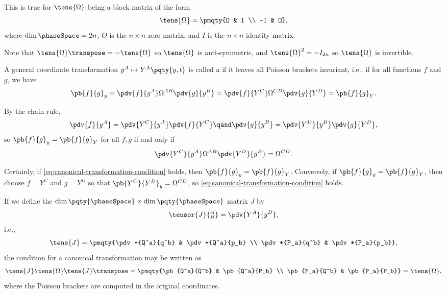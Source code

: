 This is true for \(\tens{\Omega}\) being a block matrix of the form
\begin{equation}
    \tens{\Omega} = \pmqty{O & I \\ -I & O},
\end{equation} 
where \(\dim \phaseSpace = 2n\), \(O\) is the \(n \times n\) zero matrix, and \(I\) is the \(n \times n\) identity matrix.

Note that \(\tens{\Omega} \transpose = - \tens{\Omega}\) so \(\tens{\Omega}\) is anti-symmetric, and \(\tens{\Omega}^2 = - I_{2n}\) so \(\tens{\Omega}\) is invertible.

A general coordinate transformation \(y^A \mapsto Y^A\pqty{y, t}\) is called a  if it leaves all Poisson brackets invariant, i.e., if for all functions \(f\) and \(g\), we have
\begin{equation}
    \pb{f}{g}_y = \pdv{f}{y^A} \Omega^{AB} \pdv{g}{y^B} = \pdv{f}{Y^C} \Omega^{CD} \pdv{g}{Y^D} = \pb{f}{g}_Y.
\end{equation}

By the chain rule,
\begin{equation}
    \pdv{f}{y^A} = \pdv{Y^C}{y^A} \pdv{f}{Y^C} \qand \pdv{g}{y^B} = \pdv{Y^D}{y^B} \pdv{g}{Y^D},
\end{equation}
so \(\pb{f}{g}_y = \pb{f}{g}_Y\) for all \(f, g\) if and only if
\begin{equation}
    \label{eq:canonical-transformation-condition}%
    \pdv{Y^C}{y^A} \Omega^{AB} \pdv{Y^D}{y^B} = \Omega^{CD}.
\end{equation}

Certainly, if \eqref{eq:canonical-transformation-condition} holds, then \(\pb{f}{g}_y = \pb{f}{g}_Y\). Conversely, if \(\pb{f}{g}_y = \pb{f}{g}_Y\), then choose \(f = Y^C\) and \(g = Y^D\) so that \(\pb{Y^C}{Y^D}_y = \Omega^{CD}\), so \eqref{eq:canonical-transformation-condition} holds.

If we define the \(\dim\pqty{\phaseSpace} \times \dim\pqty{\phaseSpace}\) matrix \(J\) by
\begin{equation}
    \tensor{J}{^A_B} = \pdv{Y^A}{y^B},
\end{equation}
i.e.,
\begin{equation}
    \tens{J} = \pmqty{\pdv*{Q^a}{q^b} & \pdv*{Q^a}{p_b} \\ \pdv*{P_a}{q^b} & \pdv*{P_a}{p_b}},
\end{equation}
the condition for a canonical transformation may be written as
\begin{equation}
    \tens{J} \tens{\Omega} \tens{J}\transpose = \pmqty{\pb{Q^a}{Q^b} & \pb{Q^a}{P_b} \\ \pb{P_a}{Q^b} & \pb{P_a}{P_b}} = \tens{\Omega},
\end{equation}
where the Poisson brackets are computed in the original coordinates.

